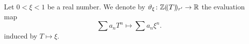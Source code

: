 %

%
%

\begin{definition}
  \label{theta}
  \leanok
  Let $0<\xi <1$ be a real number. We denote by $\vartheta_{\xi}\colon \mathbb{Z}(\!(T)\!)_{r'}\rightarrow \mathbb{R}$ the evaluation map
  \[
    \sum a_nT^n\longmapsto \sum a_n\xi^n.
  \]
induced by $T\mapsto \xi$.
\end{definition}

